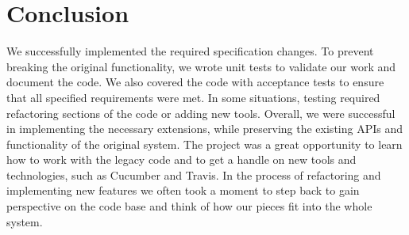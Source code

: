 \documentclass[a4paper]{article}
\begin{document}
\section{Conclusion}

We successfully implemented the required specification changes. To prevent breaking the original functionality, we wrote unit tests to validate our work and document the code. We also covered the code with acceptance tests to ensure that all specified requirements were met. In some situations, testing required refactoring sections of the code or adding new tools. Overall, we were successful in implementing the necessary extensions, while preserving the existing APIs and functionality of the original system. The project was a great opportunity to learn how to work with the legacy code and to get a handle on new tools and technologies, such as Cucumber and Travis. In the process of refactoring and implementing new features we often took a moment to step back to gain perspective on the code base and think of how our pieces fit into the whole system.
\end{document}
